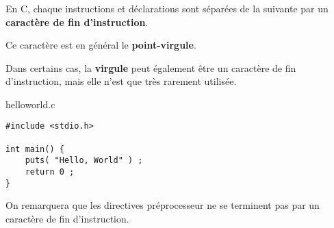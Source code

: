 \begin{frame}[containsverbatim]
  \frametitle{\secname}
  \framesubtitle{\subsecname}
 
  En C, chaque instructions et déclarations sont séparées de la suivante par un \textbf{caractère de fin d'instruction}.
  \par
  Ce caractère est en général le \textbf{point-virgule}.
  \par
  Dans certains cas, la \textbf{virgule} peut également être un caractère de fin d'instruction, mais elle n'est que très rarement utilisée.
  \begin{exampleblock}{helloworld.c}
    \begin{verbatim}
#include <stdio.h>

int main() {
    puts( "Hello, World" ) ; 
    return 0 ; 
} \end{verbatim}
  \end{exampleblock}
  On remarquera que les directives préprocesseur ne se terminent pas par un caractère de fin d'instruction.
\end{frame}

